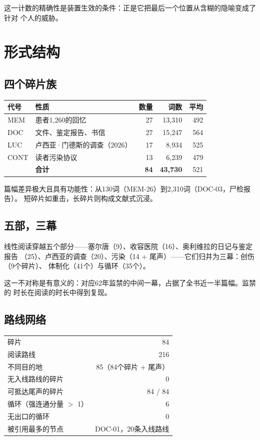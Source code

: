 \documentclass[11pt,a4paper]{article}
\begin{document}
这一计数的精确性是装置生效的条件：正是它把最后一个位置从含糊的隐喻变成了针对
个人的威胁。

\section{形式结构}

\subsection{四个碎片族}

\begin{center}\small
\begin{tabular}{@{}llrrr@{}}
\toprule
\textbf{代号} & \textbf{性质} & \textbf{数量} & \textbf{词数} & \textbf{平均} \\
\midrule
MEM  & 患者1,260的回忆 & 27 & 13,310 & 492 \\
DOC  & 文件、鉴定报告、书信 & 27 & 15,247 & 564 \\
LUC  & 卢西亚·门德斯的调查（2026） & 17 & 8,934 & 525 \\
CONT & 读者污染协议 & 13 & 6,239 & 479 \\
\midrule
     & \textbf{合计} & \textbf{84} & \textbf{43,730} & 521 \\
\bottomrule
\end{tabular}
\end{center}

篇幅差异极大且具有功能性：从130词（MEM-26）到2,310词（DOC-03，尸检报告）。
短碎片如重击，长碎片则构成文献式沉浸。

\subsection{五部，三幕}

线性阅读穿越五个部分——塞尔唐（9）、收容医院（16）、奥利维拉的日记与鉴定报告
（25）、卢西亚的调查（20）、污染（14 + 尾声）——它们归并为三幕：创伤（9个碎片）、
体制化（41个）与循环（35个）。

这一不对称是有意义的：对应62年监禁的中间一幕，占据了全书近一半篇幅。监禁的
时长在阅读的时长中得到复现。

\subsection{路线网络}

\begin{center}\small
\begin{tabular}{@{}lr@{}}
\toprule
碎片 & 84 \\
阅读路线 & 216 \\
不同目的地 & 85（84个碎片 + 尾声） \\
无入线路线的碎片 & 0 \\
可抵达尾声的碎片 & 84 / 84 \\
循环（强连通分量 $>$ 1） & 6 \\
无出口的循环 & 0 \\
被引用最多的节点 & DOC-01，20条入线路线 \\
\bottomrule
\end{tabular}
\end{center}
\end{document}
